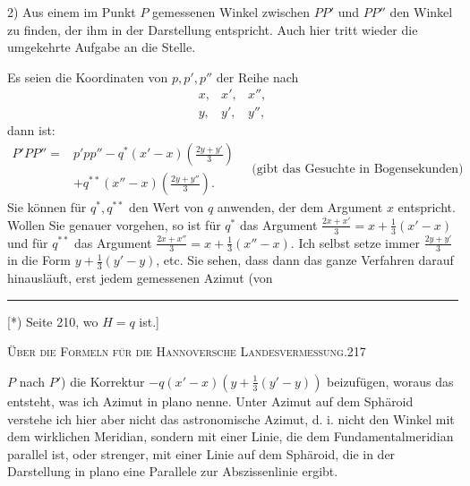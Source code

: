 2) Aus einem im Punkt \(P\) gemessenen Winkel zwischen \(PP'\) und \(PP''\) den Winkel zu finden, der ihm in der Darstellung entspricht. Auch hier tritt wieder die umgekehrte Aufgabe an die Stelle.
\begin{center}
\end{center}
Es seien die Koordinaten von \(p,p',p''\) der Reihe nach
\[
\begin{array}{ccc}x,&x',&x'',\\y,&y',&y'',\end{array}
\]
\noindent dann ist:
\[
\begin{aligned}
P'PP''={}&p'pp''-q^*(x'-x)\left(\frac{2y+y'}3\right)\\
&+q^{**}(x''-x)\left(\frac{2y+y''}3\right).
\end{aligned}
\quad\text{(gibt das Gesuchte in Bogensekunden)}
\]
Sie können für \(q^*,q^{**}\) den Wert von \(q\) anwenden, der dem Argument \(x\) entspricht. Wollen Sie genauer vorgehen, so ist für \(q^*\) das Argument \(\frac{2x+x'}3=x+\frac13(x'-x)\) und für \(q^{**}\) das Argument \(\frac{2x+x''}3=x+\frac13(x''-x)\). Ich selbst setze immer \(\frac{2y+y'}3\) in die Form \(y+\frac13(y'-y)\), etc. Sie sehen, dass dann das ganze Verfahren darauf hinausläuft, erst jedem gemessenen Azimut (von
\par\noindent\rule{4cm}{.4pt}\par
{\footnotesize\noindent\hspace*{\parindent}[*) Seite 210, wo \(H=q\) ist.]\par}

\par\clearpage
\noindent\mbox{}\hfill{\small\textsc{Über die Formeln für die Hannoversche Landesvermessung.}}\hfill217\par\medskip
\noindent \(P\) nach \(P'\)) die Korrektur \(-q(x'-x)(y+\frac13(y'-y))\) beizufügen, woraus das entsteht, was ich Azimut in plano nenne. Unter Azimut auf dem Sphäroid verstehe ich hier aber nicht das astronomische Azimut, d. i. nicht den Winkel mit dem wirklichen Meridian, sondern mit einer Linie, die dem Fundamentalmeridian parallel ist, oder strenger, mit einer Linie auf dem Sphäroid, die in der Darstellung in plano eine Parallele zur Abszissenlinie ergibt.

